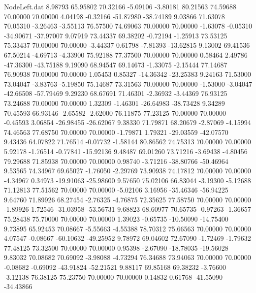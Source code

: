 \begin{filecontents}{NodeLeft.dat}
   8.98793   65.95802   70.32166    -5.09106   -3.80181   80.21563   74.59688   70.00000   70.00000    4.04198   -0.32166  -51.87980  -38.74189
   9.03866   71.63078   70.05310    -3.26463   -3.55113   76.57500   74.69063   70.00000   70.00000   -1.63078   -0.05310  -34.90671  -37.97007
   9.07919   73.44337   69.38202    -0.72194   -1.25913   73.53125   75.33437   70.00000   70.00000   -3.44337    0.61798   -7.81393  -13.62815
   9.13002   69.41536   67.50214    -4.69713   -4.33900   75.92188   77.37500   70.00000   70.00000    0.58464    2.49786  -47.36300  -43.75188
   9.19090   68.94547   69.14673    -1.33075   -2.15444   77.14687   76.90938   70.00000   70.00000    1.05453    0.85327  -14.36342  -23.25383
   9.24163   71.53000   73.04047    -3.83763   -5.19850   75.14687   73.31563   70.00000   70.00000   -1.53000   -3.04047  -42.66508  -57.79469
   9.29230   68.67691   71.46301    -2.36932   -3.44369   76.93125   73.24688   70.00000   70.00000    1.32309   -1.46301  -26.64983  -38.73428
   9.34289   70.45593   66.93146    -2.65582   -2.62000   76.11875   77.23125   70.00000   70.00000   -0.45593    3.06854  -26.98455  -26.62067
   9.38330   71.79871   68.20679    -2.87069   -4.15994   74.46563   77.68750   70.00000   70.00000   -1.79871    1.79321  -29.03559  -42.07570
   9.43436   64.07822   71.76514    -0.07732   -1.58144   80.86562   74.75313   70.00000   70.00000    5.92178   -1.76514   -0.77841  -15.92136
   9.48487   69.01260   73.71216    -3.69438   -4.80456   79.29688   71.85938   70.00000   70.00000    0.98740   -3.71216  -38.80766  -50.46964
   9.53565   74.34967   69.65027    -1.76050   -2.29769   73.90938   74.17812   70.00000   70.00000   -4.34967    0.34973  -19.91063  -25.98600
   9.57650   75.02106   66.83044    -3.19300   -5.12688   71.12813   77.51562   70.00000   70.00000   -5.02106    3.16956  -35.46346  -56.94225
   9.64760   71.89926   68.27454    -2.76325   -4.76875   72.35625   77.58750   70.00000   70.00000   -1.89926    1.72546  -31.03958  -53.56731
   9.68823   68.60977   70.65735    -0.97263   -1.36657   75.28438   75.70000   70.00000   70.00000    1.39023   -0.65735  -10.50090  -14.75400
   9.73895   65.92453   70.08667    -5.55663   -4.55388   78.70312   75.66563   70.00000   70.00000    4.07547   -0.08667  -60.10632  -49.25952
   9.78972   69.04602   72.67090    -1.72469   -1.79632   77.48125   73.32500   70.00000   70.00000    0.95398   -2.67090  -18.78035  -19.56028
   9.83032   70.08682   70.69092    -3.98088   -4.73294   76.34688   73.94063   70.00000   70.00000   -0.08682   -0.69092  -43.91824  -52.21521
   9.88117   69.85168   69.38232    -3.76600   -3.12138   76.38125   75.23750   70.00000   70.00000    0.14832    0.61768  -41.55090  -34.43866

\end{filecontents}
